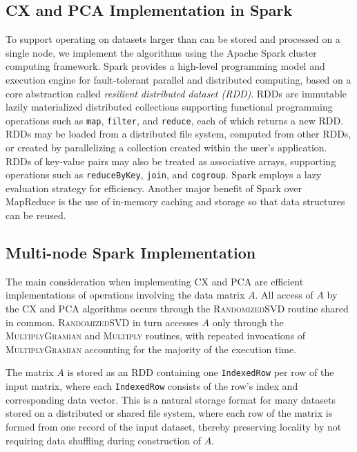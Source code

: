 
\subsection{CX and PCA Implementation in Spark}

To support operating on datasets larger than can be stored and processed on a single node,
we implement the algorithms using the Apache Spark cluster computing framework.
Spark provides a high-level programming model and execution engine for
fault-tolerant parallel and distributed computing, based on a core 
abstraction called \textit{resilient distributed dataset (RDD)}.
RDDs are immutable lazily materialized distributed collections supporting functional
programming operations such as \texttt{map}, \texttt{filter}, and \texttt{reduce},
each of which returns a new RDD.
RDDs may be loaded from a distributed file system, computed from other RDDs,
or created by parallelizing a collection created within the user's application.
RDDs of key-value pairs may also be treated as associative arrays, supporting
operations such as \texttt{reduceByKey}, \texttt{join}, and \texttt{cogroup}.
Spark employs a lazy evaluation strategy for efficiency.
Another major benefit of Spark over MapReduce is the use of in-memory caching and storage so that data structures
can be reused. %

\subsection{Multi-node Spark Implementation}
\label{sec:cx_spark}
The main consideration when implementing CX and PCA %
are
efficient implementations of operations involving the data matrix $A$.
All access of $A$ by the CX and PCA algorithms occurs through the
\textsc{RandomizedSVD} routine shared in common.
\textsc{RandomizedSVD} in turn accesses $A$ only through the \textsc{MultiplyGramian} and
\textsc{Multiply} routines, with repeated invocations of \textsc{MultiplyGramian}
accounting for the majority of the %
execution time.

The matrix $A$ is stored as an RDD containing one \texttt{IndexedRow} per row of the input matrix,
where each \texttt{IndexedRow} consists of the row's index and corresponding data vector.
This is a natural storage format for many datasets stored on a distributed or shared file
system, where each row of the matrix is formed from one record of the
input dataset, thereby preserving locality by not requiring data shuffling
during construction of $A$.

